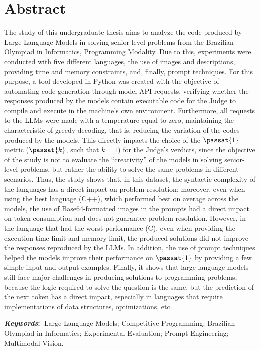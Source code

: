 \chapter*{Abstract}

The study of this undergraduate thesis aims to analyze the code produced by Large Language Models in solving senior-level problems from the Brazilian Olympiad in Informatics, Programming Modality. Due to this, experiments were conducted with five different languages, the use of images and descriptions, providing time and memory constraints, and, finally, prompt techniques.
For this purpose, a tool developed in Python was created with the objective of automating code generation through model API requests, verifying whether the responses produced by the models contain executable code for the Judge to compile and execute in the machine's own environment.
Furthermore, all requests to the LLMs were made with a temperature equal to zero, maintaining the characteristic of greedy decoding, that is, reducing the variation of the codes produced by the models. This directly impacts the choice of the $\passat{1}$ metric ($\passat{k}$, such that $k = 1$) for the Judge's verdicts, since the objective of the study is not to evaluate the ``creativity'' of the models in solving senior-level problems, but rather the ability to solve the same problems in different scenarios.
Thus, the study shows that, in this dataset, the syntactic complexity of the languages has a direct impact on problem resolution; moreover, even when using the best language (C++), which performed best on average across the models, the use of Base64-formatted images in the prompts had a direct impact on token consumption and does not guarantee problem resolution. However, in the language that had the worst performance (C), even when providing the execution time limit and memory limit, the produced solutions did not improve the responses reproduced by the LLMs. In addition, the use of prompt techniques helped the models improve their performance on $\passat{1}$ by providing a few simple input and output examples. Finally, it shows that large language models still face major challenges in producing solutions to programming problems, because the logic required to solve the question is the same, but the prediction of the next token has a direct impact, especially in languages that require implementations of data structures, optimizations, etc.

\vspace{5mm}
\noindent\textbf{\textit{Keywords}:~}Large Language Models; Competitive Programming; Brazilian Olympiad in Informatics; Experimental Evaluation; Prompt Engineering; Multimodal Vision.

